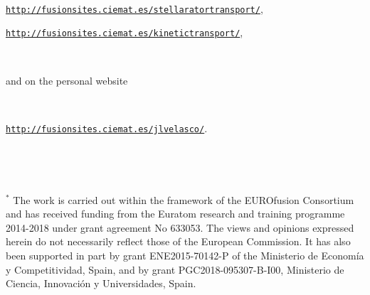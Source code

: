 \begin{tcolorbox}[colback=gray!5,colframe=gray!40!black]
\

\href{http://fusionsites.ciemat.es/stellaratortransport/}{\nolinkurl{http://fusionsites.ciemat.es/stellaratortransport/}}, 

\href{http://fusionsites.ciemat.es/kinetictransport/}{\nolinkurl{http://fusionsites.ciemat.es/kinetictransport/}},

\

and  on the personal website

\

\href{http://fusionsites.ciemat.es/jlvelasco/}{\nolinkurl{http://fusionsites.ciemat.es/jlvelasco/}}.

\

\

\footnotesize{$^*$ The work is carried out within the framework of the EUROfusion Consortium and has received funding from the Euratom research and training programme 2014-2018 under grant agreement No 633053. The views and opinions expressed herein do not necessarily reflect those of the European Commission. It has also been supported in part by grant ENE2015-70142-P of the Ministerio de Econom\'ia y Competitividad, Spain, and by grant PGC2018-095307-B-I00, Ministerio de Ciencia, Innovaci\'on y Universidades, Spain.}

\


\end{tcolorbox}






